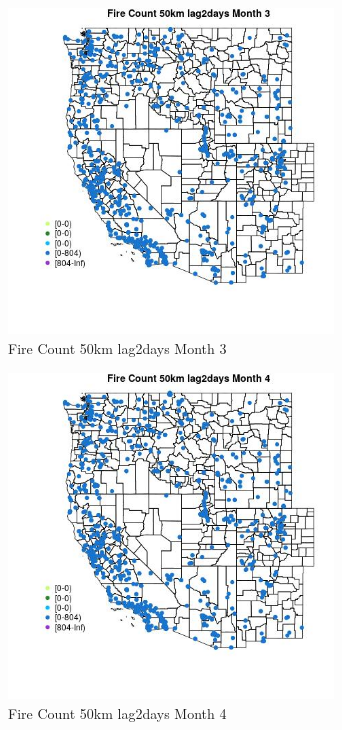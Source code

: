 \begin{figure} 
\centering  
\includegraphics[width=0.77\textwidth]{Code_Outputs/Report_ML_input_PM25_Step4_part_f_de_duplicated_aves_prioritize_24hr_obswNAs_MapObsMo3Fire_Count_50km_lag2days.jpg} 
\caption{\label{fig:Report_ML_input_PM25_Step4_part_f_de_duplicated_aves_prioritize_24hr_obswNAsMapObsMo3Fire_Count_50km_lag2days}Fire Count 50km lag2days Month 3} 
\end{figure} 
 

\begin{figure} 
\centering  
\includegraphics[width=0.77\textwidth]{Code_Outputs/Report_ML_input_PM25_Step4_part_f_de_duplicated_aves_prioritize_24hr_obswNAs_MapObsMo4Fire_Count_50km_lag2days.jpg} 
\caption{\label{fig:Report_ML_input_PM25_Step4_part_f_de_duplicated_aves_prioritize_24hr_obswNAsMapObsMo4Fire_Count_50km_lag2days}Fire Count 50km lag2days Month 4} 
\end{figure} 
 

